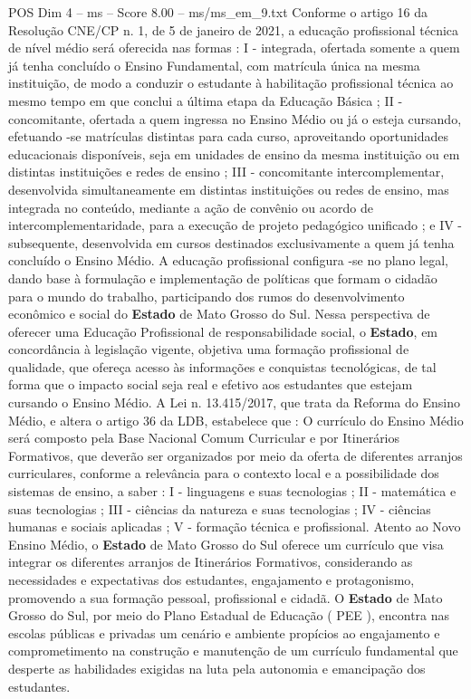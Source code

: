 \begin{textsample}{POS Dim 4 – ms – Score 8.00 – ms/ms\_em\_9.txt}
Conforme o artigo 16 da Resolução CNE/CP n. 1, de 5 de janeiro de 2021, a educação profissional técnica de nível médio será oferecida nas formas : I - integrada, ofertada somente a quem já tenha concluído o Ensino Fundamental, com matrícula única na mesma instituição, de modo a conduzir o estudante à habilitação profissional técnica ao mesmo tempo em que conclui a última etapa da Educação Básica ; II - concomitante, ofertada a quem ingressa no Ensino Médio ou já o esteja cursando, efetuando -se matrículas distintas para cada curso, aproveitando oportunidades educacionais disponíveis, seja em unidades de ensino da mesma instituição ou em distintas instituições e redes de ensino ; III - concomitante intercomplementar, desenvolvida simultaneamente em distintas instituições ou redes de ensino, mas integrada no conteúdo, mediante a ação de convênio ou acordo de intercomplementaridade, para a execução de projeto pedagógico unificado ; e IV - subsequente, desenvolvida em cursos destinados exclusivamente a quem já tenha concluído o Ensino Médio.
A educação profissional configura -se no plano legal, dando base à formulação e implementação de políticas que formam o cidadão para o mundo do trabalho, participando dos rumos do desenvolvimento econômico e social do \textbf{Estado} de Mato Grosso do Sul.
Nessa perspectiva de oferecer uma Educação Profissional de responsabilidade social, o \textbf{Estado}, em concordância à legislação vigente, objetiva uma formação profissional de qualidade, que ofereça acesso às informações e conquistas tecnológicas, de tal forma que o impacto social seja real e efetivo aos estudantes que estejam cursando o Ensino Médio.
A Lei n. 13.415/2017, que trata da Reforma do Ensino Médio, e altera o artigo 36 da LDB, estabelece que : O currículo do Ensino Médio será composto pela Base Nacional Comum Curricular e por Itinerários Formativos, que deverão ser organizados por meio da oferta de diferentes arranjos curriculares, conforme a relevância para o contexto local e a possibilidade dos sistemas de ensino, a saber : I - linguagens e suas tecnologias ; II - matemática e suas tecnologias ; III - ciências da natureza e suas tecnologias ; IV - ciências humanas e sociais aplicadas ; V - formação técnica e profissional.
Atento ao Novo Ensino Médio, o \textbf{Estado} de Mato Grosso do Sul oferece um currículo que visa integrar os diferentes arranjos de Itinerários Formativos, considerando as necessidades e expectativas dos estudantes, engajamento e protagonismo, promovendo a sua formação pessoal, profissional e cidadã.
O \textbf{Estado} de Mato Grosso do Sul, por meio do Plano Estadual de Educação ( PEE ), encontra nas escolas públicas e privadas um cenário e ambiente propícios ao engajamento e comprometimento na construção e manutenção de um currículo fundamental que desperte as habilidades exigidas na luta pela autonomia e emancipação dos estudantes.

\end{textsample}

